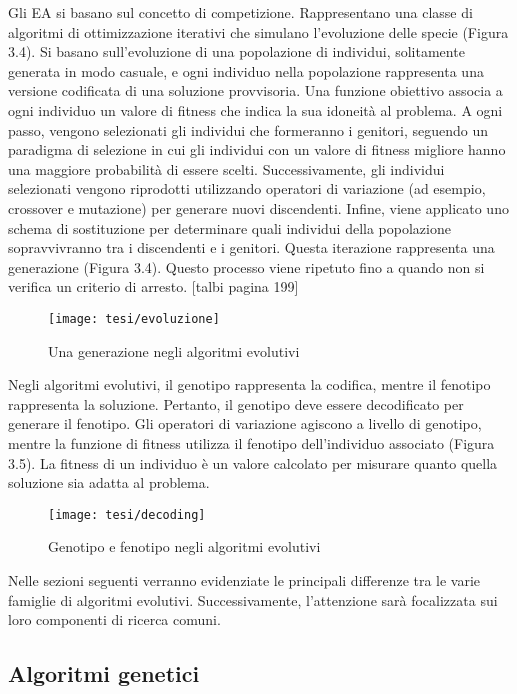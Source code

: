 Gli EA si basano sul concetto di competizione. Rappresentano una classe di algoritmi di ottimizzazione iterativi che simulano l'evoluzione delle specie (Figura 3.4). Si basano sull'evoluzione di una popolazione di individui, solitamente generata in modo casuale, e ogni individuo nella popolazione rappresenta una versione codificata di una soluzione provvisoria. Una funzione obiettivo associa a ogni individuo un valore di fitness che indica la sua idoneità al problema. A ogni passo, vengono selezionati gli individui che formeranno i genitori, seguendo un paradigma di selezione in cui gli individui con un valore di fitness migliore hanno una maggiore probabilità di essere scelti. Successivamente, gli individui selezionati vengono riprodotti utilizzando operatori di variazione (ad esempio, crossover e mutazione) per generare nuovi discendenti. Infine, viene applicato uno schema di sostituzione per determinare quali individui della popolazione sopravvivranno tra i discendenti e i genitori. Questa iterazione rappresenta una generazione (Figura 3.4). Questo processo viene ripetuto fino a quando non si verifica un criterio di arresto. [talbi pagina 199]

\begin{figure}[h!] 
    \centering 
    \texttt{[image: tesi/evoluzione]} 
    \caption{Una generazione negli algoritmi evolutivi}
\end{figure}

Negli algoritmi evolutivi, il genotipo rappresenta la codifica, mentre il fenotipo rappresenta la soluzione. Pertanto, il genotipo deve essere decodificato per generare il fenotipo. Gli operatori di variazione agiscono a livello di genotipo, mentre la funzione di fitness utilizza il fenotipo dell'individuo associato (Figura 3.5). La fitness di un individuo è un valore calcolato per misurare quanto quella soluzione sia adatta al problema. 

\begin{figure}[h!] 
    \centering 
    \texttt{[image: tesi/decoding]} 
    \caption{Genotipo e fenotipo negli algoritmi evolutivi}
\end{figure}

Nelle sezioni seguenti verranno evidenziate le principali differenze tra le varie famiglie di algoritmi evolutivi. Successivamente, l'attenzione sarà focalizzata sui loro componenti di ricerca comuni.

\subsection{Algoritmi genetici}

